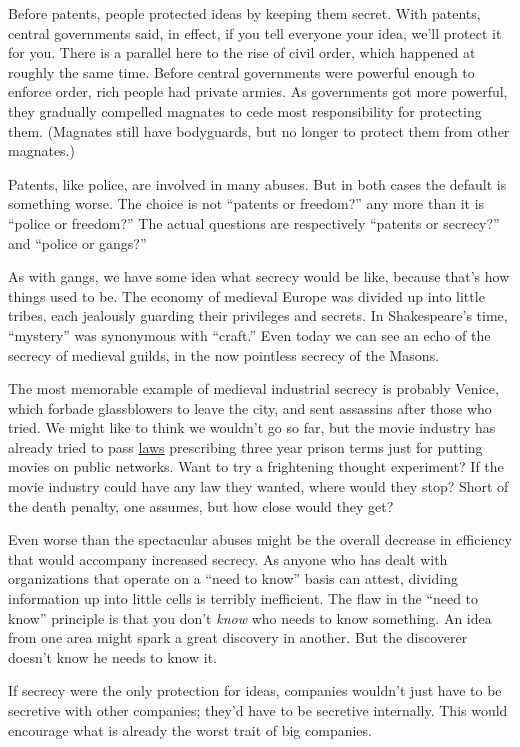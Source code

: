 \documentclass[12pt]{book}
\begin{document}
Before patents, people protected ideas by keeping them secret. With
patents, central governments said, in effect, if you tell everyone your
idea, we'll protect it for you. There is a parallel here to the rise of
civil order, which happened at roughly the same time. Before central
governments were powerful enough to enforce order, rich people had
private armies. As governments got more powerful, they gradually
compelled magnates to cede most responsibility for protecting them.
(Magnates still have bodyguards, but no longer to protect them from
other magnates.)

Patents, like police, are involved in many abuses. But in both cases the
default is something worse. The choice is not ``patents or freedom?''
any more than it is ``police or freedom?'' The actual questions are
respectively ``patents or secrecy?'' and ``police or gangs?''

As with gangs, we have some idea what secrecy would be like, because
that's how things used to be. The economy of medieval Europe was divided
up into little tribes, each jealously guarding their privileges and
secrets. In Shakespeare's time, ``mystery'' was synonymous with
``craft.'' Even today we can see an echo of the secrecy of medieval
guilds, in the now pointless secrecy of the Masons.

The most memorable example of medieval industrial secrecy is probably
Venice, which forbade glassblowers to leave the city, and sent assassins
after those who tried. We might like to think we wouldn't go so far, but
the movie industry has already tried to pass
\href{http://news.com.com/2100-1026_3-5106684.html}{laws} prescribing
three year prison terms just for putting movies on public networks. Want
to try a frightening thought experiment? If the movie industry could
have any law they wanted, where would they stop? Short of the death
penalty, one assumes, but how close would they get?

Even worse than the spectacular abuses might be the overall decrease in
efficiency that would accompany increased secrecy. As anyone who has
dealt with organizations that operate on a ``need to know'' basis can
attest, dividing information up into little cells is terribly
inefficient. The flaw in the ``need to know'' principle is that you
don't \emph{know} who needs to know something. An idea from one area
might spark a great discovery in another. But the discoverer doesn't
know he needs to know it.

If secrecy were the only protection for ideas, companies wouldn't just
have to be secretive with other companies; they'd have to be secretive
internally. This would encourage what is already the worst trait of big
companies.
\end{document}
